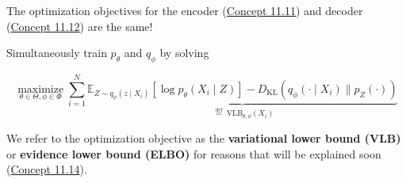 \begin{definition}
    The optimization objectives for the encoder (\hyperref[concept:11.11]{Concept 11.11}) and decoder (\hyperref[concept:11.12]{Concept 11.12}) are the same!

    Simultaneously train $p_{\theta}$ and $q_{\phi}$ by solving

    $$
    \underset{\theta \in \Theta, \phi \in \Phi}{\operatorname{maximize}} \sum_{i=1}^{N} \underbrace{\mathbb{E}_{Z \sim q_{\phi}\left(z \mid X_{i}\right)}\left[\log p_{\theta}\left(X_{i} \mid Z\right)\right]-D_{\mathrm{KL}}\left(q_{\phi}\left(\cdot \mid X_{i}\right) \| p_{Z}(\cdot)\right)}_{\stackrel{\text { def }}{=} \mathrm{VLB}_{\theta, \phi}\left(X_{i}\right)}
    $$

    We refer to the optimization objective as the \textbf{variational lower bound (VLB)} or \textbf{evidence lower bound (ELBO)} for reasons that will be explained soon (\hyperref[concept:11.14]{Concept 11.14}).
\end{definition}

